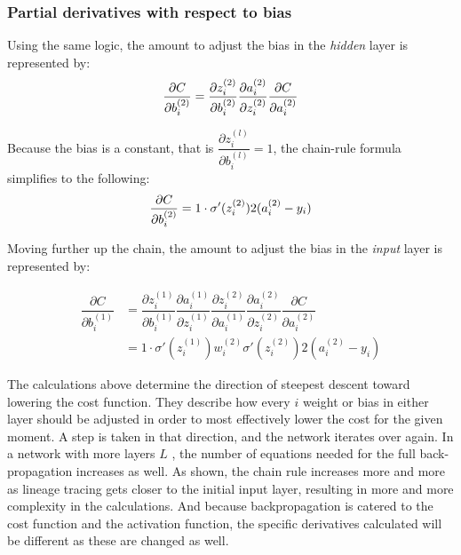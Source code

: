 

\subsubsection{Partial derivatives with respect to
bias}

Using the same logic, the amount to adjust the bias in the \emph{hidden} layer is
represented by: \[
\frac{\partial{C}}{\partial{b_i^{(2)}}}  =  \dfrac{\partial{z_i^{(2)}}}{\partial{b_i^{(2)}}}
     \dfrac{\partial{a_i^{(2)}}}{\partial{z_i^{(2)}}}
     \dfrac{\partial{C}}{\partial{a_i^{(2)}}} \\
\]

Because the bias is a constant, that is
\(\dfrac{\partial{z_i^{(l)}}}{\partial{b_i^{(l)}}} = 1\), the chain-rule
formula simplifies to the following: \[
\frac{\partial{C}}{\partial{b_i^{(2)}}} = 1 \cdot \sigma'(z_i^{(2)}) 2(a_i^{(2)}-y_i) \\
\]

Moving further up the chain, the amount to adjust the bias in the \emph{input} layer is
represented by:

    \begin{align*}
\dfrac{\partial{C}}{\partial{b_i^{(1)}}} 
& = \dfrac{\partial{z_i^{(1)}}}{\partial{b_i^{(1)}}} \dfrac{\partial{a_i^{(1)}}}{\partial{z_i^{(1)}}}  \dfrac{\partial{z_i^{(2)}}}{\partial{a_i^{(1)}}}
     \dfrac{\partial{a_i^{(2)}}}{\partial{z_i^{(2)}}}
     \dfrac{\partial{C}}{\partial{a_i^{(2)}}} \\ \nonumber
& = 1 \cdot \sigma'(z_i^{(1)}) w_i^{(2)} \sigma'(z_i^{(2)}) 2(a_i^{(2)}-y_i) \nonumber
    \end{align*}

The calculations above determine the direction of steepest descent toward lowering the cost function.  They describe how every $i$ weight or bias in either layer should be adjusted in order to most effectively lower the cost for the given moment.  A step is taken in that direction, and the network iterates over again.  In a network with more layers $L$ , the number of equations needed for the full back-propagation increases as well.  As shown, the chain rule increases more and more as lineage tracing gets closer to the initial input layer, resulting in more and more complexity in the calculations.  And because backpropagation is catered to the cost function and the activation function, the specific derivatives calculated will be different as these are changed as well.









